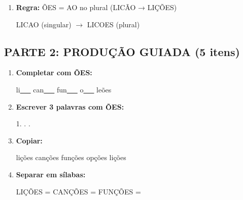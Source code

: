 \begin{exercicio}
\begin{enumerate}
  \item \textbf{Regra:} ÕES = AO no plural (LICÃO → LIÇÕES)
  \begin{center}
  LICAO (singular) $\rightarrow$ LICOES (plural)
  \end{center}
\end{enumerate}

\subsection*{PARTE 2: PRODUÇÃO GUIADA (5 itens)}

\begin{enumerate}[resume]
  \item \textbf{Completar com ÕES:}
  \begin{center}
  li\underline{~~~} \quad can\underline{~~~} \quad fun\underline{~~~} \quad o\underline{~~~} \quad le\~{o}es \underline{\hspace{0.5cm}}
  \end{center}

  \item \textbf{Escrever 3 palavras com ÕES:}
  \begin{center}
  1. \underline{\hspace{3cm}} . \underline{\hspace{3cm}} . \underline{\hspace{3cm}}
  \end{center}

  \item \textbf{Copiar:}
  \begin{center}
  lições \quad canções \quad funções \quad opções \quad lições
  \end{center}

  \item \textbf{Separar em sílabas:}
  \begin{center}
  LIÇÕES = \underline{\hspace{1cm}} \underline{\hspace{1cm}} \underline{\hspace{1cm}} \quad CANÇÕES = \underline{\hspace{1cm}} \underline{\hspace{1cm}} \underline{\hspace{1cm}} \quad FUNÇÕES = \underline{\hspace{1cm}} \underline{\hspace{1cm}} \underline{\hspace{1cm}}
  \end{center}


\end{enumerate}
\end{exercicio}
